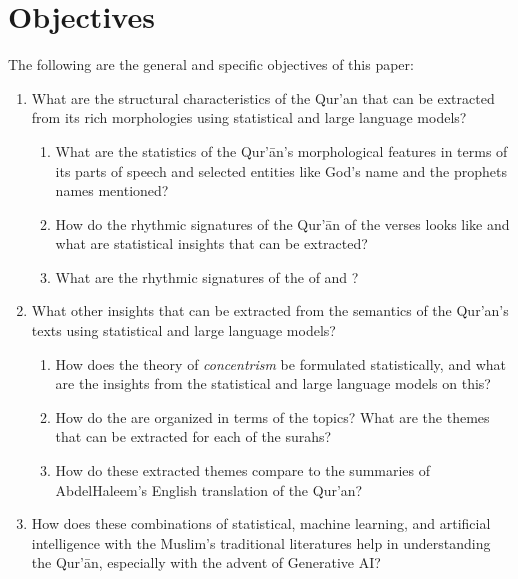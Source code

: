 \section{Objectives}\label{sec:objectives}
The following are the general and specific objectives of this paper:
\begin{enumerate}
    \item What are the structural characteristics of the Qur'an that can be extracted from its rich morphologies using statistical and large language models?
    \begin{enumerate}
        \item What are the statistics of the Qur'\=an's morphological features in terms of its parts of speech and selected entities like God's name and the prophets names mentioned?
        
        \item How do the rhythmic signatures of the Qur'\=an of the verses looks like and what are statistical insights that can be extracted?

        \item What are the rhythmic signatures of the   of   and    ?
    \end{enumerate}
    
    \item What other insights that can be extracted from the semantics of the Qur'an's texts using statistical and large language models?
    \begin{enumerate}
        \item How does the theory of \textit{concentrism} be formulated statistically, and what are the insights from the statistical and large language models on this? 
        
        \item How do the   are organized in terms of the topics? What are the themes that can be extracted for each of the surahs?
        
        \item How do these extracted themes compare to the summaries of Abdel\linebreak Haleem's English translation of the Qur'an?
    \end{enumerate}
    
    \item How does these combinations of statistical, machine learning, and artificial intelligence with the Muslim's traditional literatures help in understanding the Qur'\=an, especially with the advent of Generative AI?
\end{enumerate}

